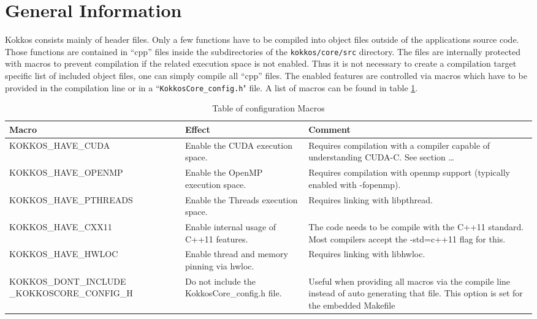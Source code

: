 \section{General Information}
Kokkos consists mainly of header files. 
Only a few functions have to be compiled into object files outside of the applications source code.
Those functions are contained in “cpp” files inside the subdirectories of the \lstinline|kokkos/core/src| directory. 
The files are internally protected with macros to prevent compilation if the related execution space is not enabled. 
Thus it is not necessary to create a compilation target specific list of included object files, one can simply compile all “cpp” files. 
The enabled features are controlled via macros which have to be provided in the compilation line or in a “\lstinline|KokkosCore_config.h|" file. 
A list of macros can be found in table \ref{TBL:CompileMacros}.
\begin{table}
\caption{Table of configuration Macros}
\label{TBL:CompileMacros}
\begin{small}
\begin{tabular}[t]{p{}p{}p{}}
\hline\hline
Macro & Effect & Comment \\
\hline
{\tiny KOKKOS\_HAVE\_CUDA} & Enable the CUDA execution space. & Requires compilation with a compiler capable of understanding CUDA-C. See section … \\
{\tiny KOKKOS\_HAVE\_OPENMP} & Enable the OpenMP execution space. & Requires compilation with openmp support (typically enabled with \newline-fopenmp). \\
{\tiny KOKKOS\_HAVE\_PTHREADS} & Enable the Threads execution space. & Requires linking with libpthread.\\
{\tiny KOKKOS\_HAVE\_CXX11} & Enable internal usage of C++11 features. & The code needs to be compile with the C++11 standard. Most compilers accept the -std=c++11 flag for this.\\
{\tiny KOKKOS\_HAVE\_HWLOC} & Enable thread and memory pinning via hwloc. & Requires linking with libhwloc.\\
{\tiny KOKKOS\_DONT\_INCLUDE \_KOKKOSCORE\_CONFIG\_H} & Do not include the KokkosCore\_config.h file. & Useful when providing all macros via the compile line instead of auto generating that file. 
This option is set for the embedded Makefile\\
\hline\hline
\end{tabular}
\end{small}
\end{table}

